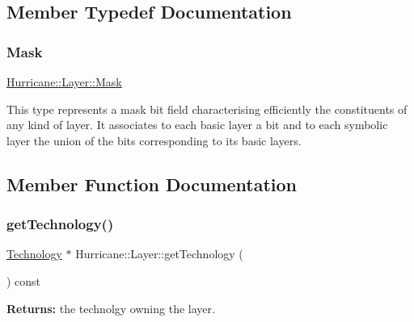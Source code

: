 \subsection{Member Typedef Documentation}
\mbox{\label{classHurricane_1_1Layer_af5277c670637bd5d910237e7afe01a91}} 
\subsubsection{\texorpdfstring{Mask}{Mask}}
{\footnotesize\ttfamily \mbox{\hyperlink{classHurricane_1_1Layer_af5277c670637bd5d910237e7afe01a91}{Hurricane\+::\+Layer\+::\+Mask}}}

This type represents a mask bit field characterising efficiently the constituents of any kind of layer. It associates to each basic layer a bit and to each symbolic layer the union of the bits corresponding to its basic layers. 

\subsection{Member Function Documentation}
\mbox{\label{classHurricane_1_1Layer_ae506b17bd7a245de622f8a8e9947629b}} 
\subsubsection{\texorpdfstring{get\+Technology()}{getTechnology()}}
{\footnotesize\ttfamily \mbox{\hyperlink{classHurricane_1_1Technology}{Technology}} $\ast$ Hurricane\+::\+Layer\+::get\+Technology (\begin{DoxyParamCaption}{ }\end{DoxyParamCaption}) const\hspace{0.3cm}{\ttfamily [inline]}}

{\bfseries Returns\+:} the technolgy owning the layer. \mbox{\label{classHurricane_1_1Layer_a3dc54f6efc60fddb8529599caa6b0f1f}} 
